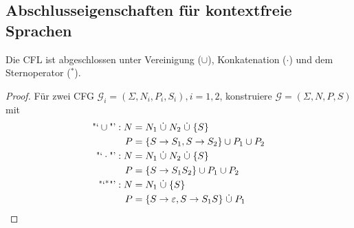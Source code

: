 % 
% 
% 
% 


\subsection{Abschlusseigenschaften für kontextfreie Sprachen}
\begin{Satz} %
  \label{thm:cfl-closed-reg-intersect}
	Die \ac{CFL} ist abgeschlossen unter Vereinigung ($\cup$), Konkatenation ($\cdot$) und dem Sternoperator ($^*$).
\end{Satz}
\begin{proof}
	Für zwei \ac{CFG} $\mathcal{G}_i = (\Sigma, N_i, P_i,S_i), i=1,2$, konstruiere $\mathcal{G} = (\Sigma, N,P,S)$ mit
	\begin{align*}
		\text{"`}\cup\text{"'}: N &= N_1\dotcup N_2\dotcup\{S\}\\
		P &= \{S\->S_1, S\->S_2 \} \cup P_1\cup P_2\\
		\text{"`}\cdot\text{"'}: N &= N_1\dotcup N_2\dotcup\{S\}\\
		P &= \{ S\->S_1S_2 \} \cup P_1\cup P_2\\
		\text{"`}^*\text{"'}: N &= N_1 \dotcup \{S\}\\
		P &= \{ S\->\Eps, S\-> S_1S \} \dotcup P_1
	\qedhere
	\end{align*}
\end{proof}

